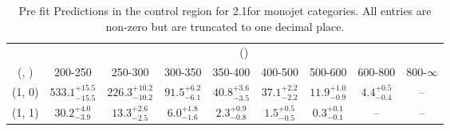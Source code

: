 \begin{table}[h!]
\tiny
\centering
\caption{Pre fit Predictions in the \mmj control region for 2.1\ifb for monojet categories. All entries are non-zero but are truncated to one decimal place.\label{tab:predsepnaive_mumu_ewk_mono}}
\begin{tabular}
{ccccccccc}
	\hline\hline
	& \multicolumn{8}{c}{\scalht (\gev)} \\ 
	 (\njet,  \nb) & 200-250 & 250-300 & 300-350 & 350-400 & 400-500 & 500-600 & 600-800 & 800-$\infty$ \\ [0.8ex] 
\hline
	(1, 0) & $533.1^{+ 15.5 }_{- 15.5 }$ & $226.3^{+ 10.2 }_{- 10.2 }$ & $91.5^{+ 6.2 }_{- 6.1 }$ & $40.8^{+ 3.6 }_{- 3.5 }$ & $37.1^{+ 2.2 }_{- 2.2 }$ & $11.9^{+ 1.0 }_{- 0.9 }$ & $4.4^{+ 0.5 }_{- 0.4 }$ & -- \\[0.5ex] 
	(1, 1) & $30.2^{+ 4.0 }_{- 3.9 }$ & $13.3^{+ 2.6 }_{- 2.5 }$ & $6.0^{+ 1.8 }_{- 1.6 }$ & $2.3^{+ 0.9 }_{- 0.8 }$ & $1.5^{+ 0.5 }_{- 0.5 }$ & $0.3^{+ 0.1 }_{- 0.1 }$ & -- & -- \\[0.5ex] 
	\hline
	\hline
\end{tabular}
\end{table}
